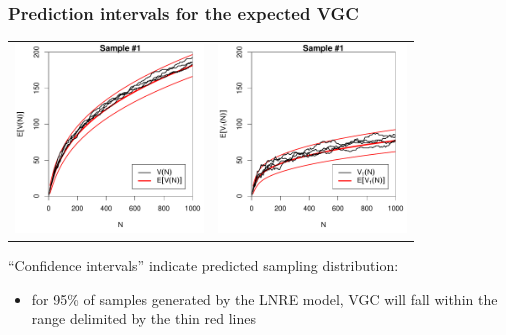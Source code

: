 \documentclass[handout,notes=show,t]{beamer} %
\begin{document}
\begin{frame}
  \frametitle{Prediction intervals for the expected VGC}

  \ungap[1]
  \begin{center}
    \begin{tabular}{c @{} c}
      \includegraphics[width=50mm]{img/05-samples-vgc-exp-vs-samples-conf} &
      \includegraphics[width=50mm]{img/05-samples-vgc-V1-exp-vs-samples-conf}
    \end{tabular}
  \end{center}

  ``Confidence intervals'' indicate predicted sampling distribution:%
  \begin{itemize}
  \item[\hand] for 95\% of samples generated by the LNRE model, VGC will fall within the range delimited by the thin red lines
  \end{itemize}

\end{frame}
\end{document}
